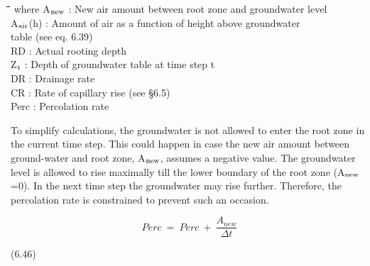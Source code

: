 \documentclass[11pt]{article}
\begin{document}
\bigskip
\nwln
\begin{tabbing}
\hspace{1.27cm}\=\hspace{1.27cm}\=\hspace{1.27cm}\=\hspace{1.27cm}\=%
\hspace{1.27cm}\=\hspace{1.27cm}\=\hspace{1.27cm}\=\hspace{1.27cm}\=%
\hspace{1.27cm}\=\hspace{1.27cm}\=\kill
where\> A$_{{\rm new}}$\> : New air amount between root zone and groundwater level\> \> \> \> \> \> \> \> [cm]\\
\>A$_{{\rm air}}$(h)\> : Amount of air as a function of height above groundwater \\
\>\>   table\>  (see eq. 6.39)\> \> \> \> \> \> \> [cm]\\
\>RD\> : Actual rooting depth\> \> \> \> \> \> \> \> [cm]\\
\>Z$_{{\rm t}}$\> : Depth of groundwater table at time step t\> \> \> \> \> \> \> \> [cm]\\
\>DR\> : Drainage rate\> \> \> \> \> \> \> \> [cm d$^{{\rm -1}}$]\\
\>CR\> : Rate of capillary rise (see \S 6.5)\> \> \> \> \> \> \> \> [cm d$^{{\rm -1}}$]\\
\>Perc\> : Percolation rate\> \> \> \> \> \> \> \> [cm d$^{{\rm -1}}$]
\end{tabbing}

\bigskip
\bigskip
To simplify calculations, the groundwater is not allowed to enter the root zone in the
current time step. This could happen in case the new air amount between ground-water
and root zone, A$_{{\rm new}}$, assumes a negative value. The groundwater level is allowed to rise
maximally till the lower boundary of the root zone (A$_{{\rm new}}$=0). In the next time step the
groundwater may rise further. Therefore, the percolation rate is con\-strained to prevent
such an occasion. 

\begin{displaymath}
Perc ~=~Perc ~+~{\frac{A _{new} }{\Delta t}}
\end{displaymath}

 \bigskip
\strut\hfill (6.46)
\end{document}
